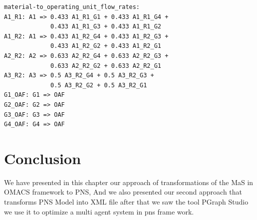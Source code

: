\begin{lstlisting}[caption=Part from Graph.in]
material-to_operating_unit_flow_rates:
A1_R1: A1 => 0.433 A1_R1_G1 + 0.433 A1_R1_G4 +
			 0.433 A1_R1_G3 + 0.433 A1_R1_G2
A1_R2: A1 => 0.433 A1_R2_G4 + 0.433 A1_R2_G3 + 
			 0.433 A1_R2_G2 + 0.433 A1_R2_G1
A2_R2: A2 => 0.633 A2_R2_G4 + 0.633 A2_R2_G3 + 
			 0.633 A2_R2_G2 + 0.633 A2_R2_G1
A3_R2: A3 => 0.5 A3_R2_G4 + 0.5 A3_R2_G3 + 
			 0.5 A3_R2_G2 + 0.5 A3_R2_G1
G1_OAF: G1 => OAF
G2_OAF: G2 => OAF
G3_OAF: G3 => OAF
G4_OAF: G4 => OAF

\end{lstlisting}


\section{Conclusion}
We have presented in this chapter our approach of transformations of the MaS in OMACS framework to PNS, And we also presented our second approach that transforms PNS Model into XML file after that we saw the tool PGraph Studio we use it to optimize a multi agent system in pns frame work.